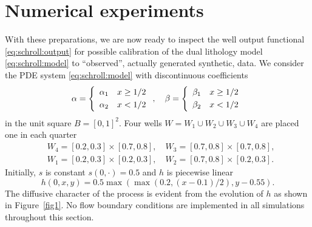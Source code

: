 \section{Numerical experiments}

With these preparations, we are now ready to inspect the well output
functional \eqref{eq:schroll:output} for possible calibration of
the dual lithology model \eqref{eq:schroll:model} to ``observed'',
actually generated synthetic, data.  We consider the PDE system
\eqref{eq:schroll:model} with discontinuous coefficients
\begin{equation}
 \alpha = \left\{
 \begin{array}{rl} \alpha_1 & x \ge 1/2 \\[\jot] \alpha_2 & x < 1/2 \end{array}
 \right.,
 \quad
 \beta = \left\{
 \begin{array}{rl} \beta_1 & x \ge 1/2 \\[\jot] \beta_2 & x < 1/2 \end{array}
 \right.
\end{equation}
in the unit square $B=[0,1]^2$.  Four wells $W = W_1 \cup W_2 \cup W_3
\cup W_4$ are placed one in each quarter
\begin{align}
 &W_4 = [0.2, 0.3] \times [0.7, 0.8], \quad
 W_3 = [0.7, 0.8] \times [0.7, 0.8],
\\
 &W_1 = [0.2, 0.3] \times [0.2, 0.3], \quad
 W_2 = [0.7, 0.8] \times [0.2, 0.3].
\end{align}
Initially, $s$ is constant $s(0,\cdot)=0.5$ and $h$ is piecewise linear
\begin{equation}
 h(0,x,y) = 0.5 \max(\max(0.2, (x-0.1)/2), y-0.55).
\end{equation}
The diffusive character of the process is evident from the evolution
of $h$ as shown in Figure~\ref{fig1}.  No flow boundary conditions are
implemented in all simulations throughout this section.

